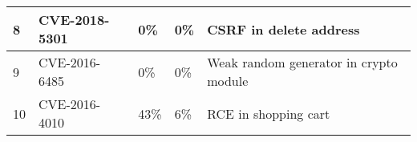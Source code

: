 \begin{table*}[]
\begin{adjustbox}{max width=0.65\textwidth}
\begin{tabular}{|lllll|}
    \multicolumn{1}{|l|}{8}           & \multicolumn{1}{l|}{CVE-2018-5301}   & \multicolumn{1}{l|}{0\%}                   & \multicolumn{1}{l|}{0\%}               & CSRF in delete address                   \\ \hline
    \multicolumn{1}{|l|}{9}           & \multicolumn{1}{l|}{CVE-2016-6485}   & \multicolumn{1}{l|}{0\%}                   & \multicolumn{1}{l|}{0\%}               & Weak random generator in crypto module   \\ \hline
    \multicolumn{1}{|l|}{10}          & \multicolumn{1}{l|}{CVE-2016-4010}   & \multicolumn{1}{l|}{43\%}                  & \multicolumn{1}{l|}{6\%}               & RCE in shopping cart                     \\ \hline
    \end{tabular}
    \end{adjustbox}
    \end{table*}

